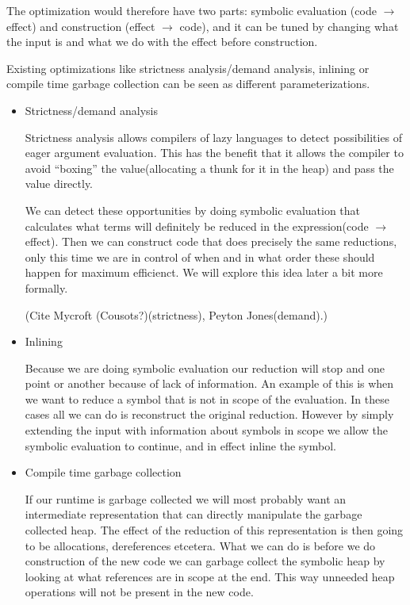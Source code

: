 \documentclass[a4paper]{article}
\begin{document}
The optimization would therefore have two parts: symbolic evaluation (code $\to$ effect) and construction (effect $\to$ code), and it can be tuned by changing what the input is and what we do with the effect before construction.

Existing optimizations like strictness analysis/demand analysis, inlining or compile time garbage collection can be seen as different parameterizations.

\begin{itemize}
\item Strictness/demand analysis

Strictness analysis allows compilers of lazy languages to detect possibilities of eager argument evaluation. This has the benefit that it allows the compiler to avoid ``boxing'' the value(allocating a thunk for it in the heap) and pass the value directly.

We can detect these opportunities by doing symbolic evaluation that calculates what terms will definitely be reduced in the expression(code $\to$ effect). Then we can construct code that does precisely the same reductions, only this time we are in control of when and in what order these should happen for maximum efficienct. We will explore this idea later a bit more formally.

(Cite Mycroft (Cousots?)(strictness), Peyton Jones(demand).)

\item Inlining

Because we are doing symbolic evaluation our reduction will stop and one point or another because of lack of information. An example of this is when we want to reduce a symbol that is not in scope of the evaluation. In these cases all we can do is reconstruct the original reduction. However by simply extending the input with information about symbols in scope we allow the symbolic evaluation to continue, and in effect inline the symbol.

\item Compile time garbage collection

If our runtime is garbage collected we will most probably want an intermediate representation that can directly manipulate the garbage collected heap. The effect of the reduction of this representation is then going to be allocations, dereferences etcetera. What we can do is before we do construction of the new code we can garbage collect the symbolic heap by looking at what references are in scope at the end. This way unneeded heap operations will not be present in the new code.

\end{itemize}
\end{document}
